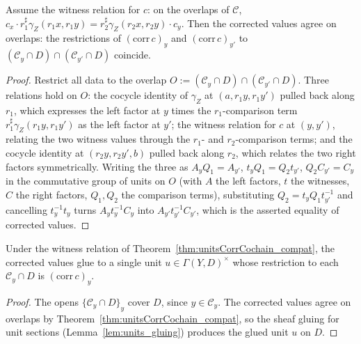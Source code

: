 \begin{theorem}
  \label{thm:unitsCorrCochain_compat}
  \leanok
  Assume the witness relation for \(c\): on the overlaps of \(\mathcal C\),
  \(c_x \cdot r_1^{\sharp}\gamma_Z(r_1 x, r_1 y) = r_2^{\sharp}\gamma_Z(r_2 x, r_2 y) \cdot c_y\).
  Then the corrected values agree on overlaps: the restrictions of \((\mathrm{corr}\,c)_y\) and
  \((\mathrm{corr}\,c)_{y'}\) to \((\mathcal C_y \cap D) \cap (\mathcal C_{y'} \cap D)\)
  coincide.
\end{theorem}
\begin{proof}
  \leanok
  Restrict all data to the overlap \(O := (\mathcal C_y \cap D) \cap (\mathcal C_{y'} \cap D)\).
  Three relations hold on \(O\): the cocycle identity of \(\gamma_Z\) at \((a, r_1 y, r_1 y')\)
  pulled back along \(r_1\), which expresses the left factor at \(y\) times the
  \(r_1\)-comparison term \(r_1^{\sharp}\gamma_Z(r_1 y, r_1 y')\) as the left factor at \(y'\);
  the witness relation for \(c\) at \((y, y')\), relating the two witness values through the
  \(r_1\)- and \(r_2\)-comparison terms; and the cocycle identity at \((r_2 y, r_2 y', b)\)
  pulled back along \(r_2\), which relates the two right factors symmetrically. Writing the
  three as \(A_y Q_1 = A_{y'}\), \(t_y Q_1 = Q_2 t_{y'}\), \(Q_2 C_{y'} = C_y\) in the
  commutative group of units on \(O\) (with \(A\) the left factors, \(t\) the witnesses, \(C\)
  the right factors, \(Q_1, Q_2\) the comparison terms), substituting \(Q_2 = t_y Q_1 t_{y'}^{-1}\)
  and cancelling \(t_y^{-1} t_y\) turns \(A_y t_y^{-1} C_y\) into \(A_{y'} t_{y'}^{-1} C_{y'}\),
  which is the asserted equality of corrected values.
\end{proof}

\begin{theorem}
  \label{thm:exists_glued_unitsCorrCochain}
  \leanok
  Under the witness relation of Theorem~\ref{thm:unitsCorrCochain_compat}, the corrected values
  glue to a single unit \(u \in \Gamma(Y, D)^{\times}\) whose restriction to each
  \(\mathcal C_y \cap D\) is \((\mathrm{corr}\,c)_y\).
\end{theorem}
\begin{proof}
  \leanok
  The opens \(\{\mathcal C_y \cap D\}_{y}\) cover \(D\), since \(y \in \mathcal C_y\). The
  corrected values agree on overlaps by Theorem~\ref{thm:unitsCorrCochain_compat}, so the sheaf
  gluing for unit sections (Lemma~\ref{lem:units_gluing}) produces the glued unit \(u\) on
  \(D\).
\end{proof}

